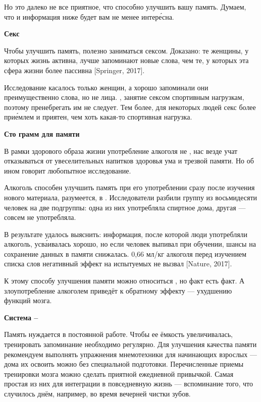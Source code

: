 Но это далеко не все приятное, что способно улучшить вашу память. Думаем, что и информация ниже будет вам не менее интер\'{е}сна.

\textbf{Секс}

Чтобы улучшить память, полезно заниматься сексом. Доказано: те женщины, у которых  жизнь активна, лучше запоминают новые слова, чем те, у которых эта сфера жизни более пассивна [Springer, 2017].

Исследование касалось только женщин, а хорошо запоминали они преимущественно слова, но не лица. , занятие сексом  спортивным нагрузкам, поэтому пренебрегать им не следует. Тем более, для некоторых людей секс более при\'{е}млем и приятен, чем хоть какая-то спортивная нагрузка.

\textbf{Сто грамм для памяти}

В рамки здорового образа жизни употребление алкоголя не , нас везде учат отказываться от увеселительных напитков  здоровья ума и трезвой памяти. Но об ином говорит любопытное исследование.

Алкоголь способен улучшить память при его употреблении сразу после изучения нового материала, разумеется, в  . Исследователи разбили группу из восьмидесяти человек на две подгруппы: одна из них употребляла спиртное дома, другая --- совсем не употребляла.

В результате удалось выяснить: информация, после  которой люди употребляли алкоголь, усв\'{а}ивалась хорошо, но если человек выпивал при обучении, шансы на сохранение данных в памяти  снижалась.  0,66 мл/кг алкоголя перед изучением списка слов негативный эффект на испытуемых не вызвал [Nature, 2017].

К этому способу улучшения памяти можно относиться , но факт есть факт. А злоупотребление алкоголем приведёт к обратному эффекту --- ухудшению функций мозга.

\textbf{Система – }

Память нуждается в постоянной работе. Чтобы ее ёмкость увеличивалась, тренировать запоминание необходимо регулярно. Для  улучшения качества памяти рекомендуем выполнять упражнения мнемотехники для начинающих взрослых --- дома их освоить можно без специальной подготовки. Перечисленные приемы тренировки мозга можно сделать приятной ежедневной привычкой. Самая простая из них для интеграции в повседневную жизнь --- вспоминание того, что случилось днём, например, во время вечерней чистки зубов.

